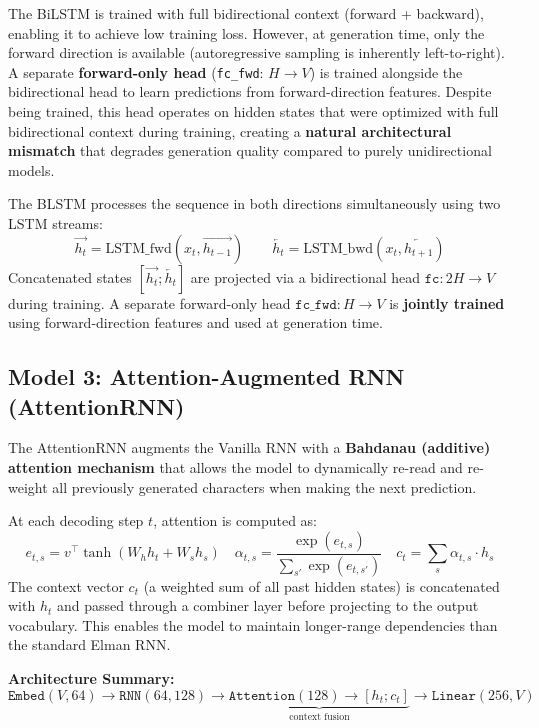 \documentclass[11pt,a4paper]{article}
\begin{document}
\begin{warningBox}
The BiLSTM is trained with full bidirectional context (forward + backward), enabling it to achieve low training loss. However, at generation time, only the forward direction is available (autoregressive sampling is inherently left-to-right). A separate \textbf{forward-only head} (\texttt{fc\_fwd}: $H \to V$) is trained alongside the bidirectional head to learn predictions from forward-direction features. Despite being trained, this head operates on hidden states that were optimized with full bidirectional context during training, creating a \textbf{natural architectural mismatch} that degrades generation quality compared to purely unidirectional models.
\end{warningBox}

The BLSTM processes the sequence in both directions simultaneously using two LSTM streams:
\[ \overrightarrow{h_t} = \text{LSTM\_fwd}(x_t, \overrightarrow{h_{t-1}}) \qquad \overleftarrow{h_t} = \text{LSTM\_bwd}(x_t, \overleftarrow{h_{t+1}}) \]
Concatenated states $[\overrightarrow{h_t}; \overleftarrow{h_t}]$ are projected via a bidirectional head $\texttt{fc}: 2H \to V$ during training. A separate forward-only head $\texttt{fc\_fwd}: H \to V$ is \textbf{jointly trained} using forward-direction features and used at generation time.

\subsection{Model 3: Attention-Augmented RNN (AttentionRNN)}

The AttentionRNN augments the Vanilla RNN with a \textbf{Bahdanau (additive) attention mechanism} that allows the model to dynamically re-read and re-weight all previously generated characters when making the next prediction.

At each decoding step $t$, attention is computed as:
\[
e_{t,s} = v^\top \tanh(W_h h_t + W_s h_s) \quad \alpha_{t,s} = \frac{\exp(e_{t,s})}{\sum_{s'} \exp(e_{t,s'})} \quad c_t = \sum_s \alpha_{t,s} \cdot h_s
\]
The context vector $c_t$ (a weighted sum of all past hidden states) is concatenated with $h_t$ and passed through a combiner layer before projecting to the output vocabulary. This enables the model to maintain longer-range dependencies than the standard Elman RNN.

\textbf{Architecture Summary:}
\[
\texttt{Embed}(V,64) \to \texttt{RNN}(64, 128) \to \underbrace{\texttt{Attention}(128) \to [h_t; c_t]}_{\text{context fusion}} \to \texttt{Linear}(256, V)
\]
\end{document}
